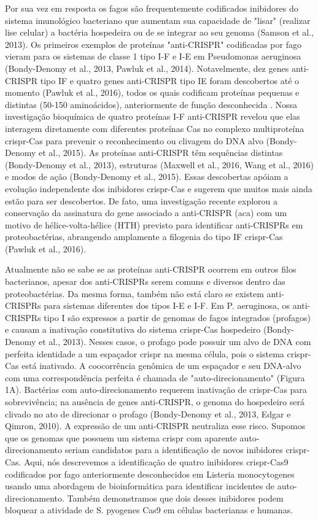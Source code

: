 \documentclass{report}
\begin{document}
Por sua vez em resposta os fagos são frequentemente codificados inibidores do sistema imunológico bacteriano que aumentam sua capacidade de "lisar" (realizar lise celular) a bactéria hospedeira ou de se integrar ao seu genoma (Samson et al., 2013). Os primeiros exemplos de proteínas "anti-CRISPR" codificadas por fago vieram para os sistemas de classe 1 tipo I-F e I-E em Pseudomonas aeruginosa (Bondy-Denomy et al., 2013, Pawluk et al., 2014). Notavelmente, dez genes anti-CRISPR tipo IF e quatro genes anti-CRISPR tipo IE foram descobertos até o momento (Pawluk et al., 2016), todos os quais codificam proteínas pequenas e distintas (50-150 aminoácidos), anteriormente de função desconhecida . Nossa investigação bioquímica de quatro proteínas I-F anti-CRISPR revelou que elas interagem diretamente com diferentes proteínas Cas no complexo multiproteína \ac{crispr}-Cas para prevenir o reconhecimento ou clivagem do DNA alvo (Bondy-Denomy et al., 2015). As proteínas anti-CRISPR têm sequências distintas (Bondy-Denomy et al., 2013), estruturas (Maxwell et al., 2016, Wang et al., 2016) e modos de ação (Bondy-Denomy et al., 2015). Essas descobertas apóiam a evolução independente dos inibidores \ac{crispr}-Cas e sugerem que muitos mais ainda estão para ser descobertos. De fato, uma investigação recente explorou a conservação da assinatura do gene associado a anti-CRISPR (aca) com um motivo de hélice-volta-hélice (HTH) previsto para identificar anti-CRISPRs em proteobactérias, abrangendo amplamente a filogenia do tipo IF \ac{crispr}-Cas (Pawluk et al., 2016).\par

Atualmente não se sabe se as proteínas anti-CRISPR ocorrem em outros filos bacterianos, apesar dos anti-CRISPRs serem comuns e diversos dentro das proteobactérias. Da mesma forma, também não está claro se existem anti-CRISPRs para sistemas diferentes dos tipos I-E e I-F. Em P. aeruginosa, os anti-CRISPRs tipo I são expressos a partir de genomas de fagos integrados (profagos) e causam a inativação constitutiva do sistema \ac{crispr}-Cas hospedeiro (Bondy-Denomy et al., 2013). Nesses casos, o profago pode possuir um alvo de DNA com perfeita identidade a um espaçador \ac{crispr} na mesma célula, pois o sistema \ac{crispr}-Cas está inativado. A coocorrência genômica de um espaçador e seu DNA-alvo com uma correspondência perfeita é chamada de "auto-direcionamento" (Figura 1A). Bactérias com auto-direcionamento requerem inativação de \ac{crispr}-Cas para sobrevivência; na ausência de genes anti-CRISPR, o genoma do hospedeiro será clivado no ato de direcionar o profago (Bondy-Denomy et al., 2013, Edgar e Qimron, 2010). A expressão de um anti-CRISPR neutraliza esse risco. Supomos que os genomas que possuem um sistema \ac{crispr} com aparente auto-direcionamento seriam candidatos para a identificação de novos inibidores \ac{crispr}-Cas. Aqui, nós descrevemos a identificação de quatro inibidores \ac{crispr}-Cas9 codificados por fago anteriormente desconhecidos em Listeria monocytogenes usando uma abordagem de bioinformática para identificar incidentes de auto-direcionamento. Também demonstramos que dois desses inibidores podem bloquear a atividade de S. pyogenes Cas9 em células bacterianas e humanas.
\end{document}
